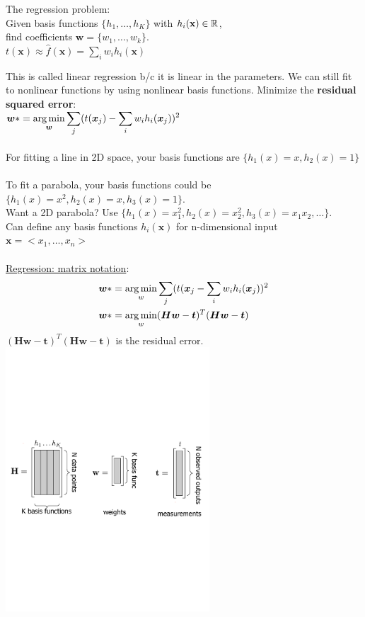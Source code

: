 The regression problem: \hfill \\
Given basis functions $\{ h_1, \dots, h_K \}$  with $h_i(\bf{x}) \in \mathbb{R}$,  \hfill \\
	find coefficients $\bm{w} = \{ w_1, \dots, w_k \}$.  \hfill \\%
$t(\bm{x}) \approx \widehat{f}(\bm{x}) = \sum_i w_i h_i(\bm{x})$ 

This is called linear regression b/c it is linear in the parameters. 
We can still fit to nonlinear functions by using nonlinear basis functions. 
Minimize the \textbf{residual squared error}: \hfill \\
$ \displaystyle \bm{w}* = \operatorname*{arg\,min}_{\bm{w}}  \sum_j (t(\bm{x}_j) - \sum_i w_i h_i(\bm{x}_j))^2$
\hfill \\  \hfill \\

For fitting a line in 2D space, your basis functions are $\{ h_1(x) = x, h_2(x) = 1 \}$  \hfill \\  \hfill \\

To fit a parabola, your basis functions could be $\{ h_1(x) = x^2, h_2(x)=x, h_3(x)=1 \}$.   \hfill \\
Want a 2D parabola? Use $\{ h_1(x) = x_1^2, h_2(x)=x_2^2, h_3(x)=x_1 x_2, \dots \}$. \hfill \\
Can define any basis functions $h_i(\bm{x})$ for n-dimensional input $\bm{x} = <x_1, \dots, x_n>$
\hfill \\  \hfill \\

\underline{Regression: matrix notation}: \hfill \\
\begin{align*}
	\bm{w}* &= \operatorname*{arg\,min}_w \sum_j(t(\bm{x}_j - \sum_i w_i h_i(\bm{x}_j))^2  \\
	\bm{w}* &= \operatorname*{arg\,min}_w (\bm{Hw} -\bm{t})^T (\bm{Hw} -\bm{t})
\end{align*}
$  (\bm{Hw} -\bm{t})^T (\bm{Hw} -\bm{t})$ is the residual error. 
\includegraphics[width=3in]{figures/Least_squares_matricies.pdf}

